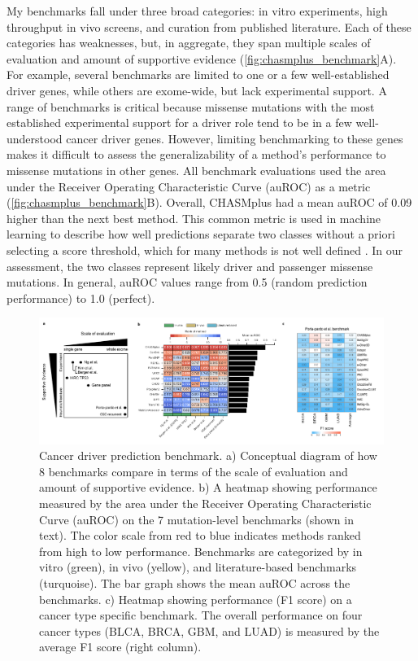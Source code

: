 My benchmarks fall under three broad categories: in vitro experiments, high throughput in vivo screens, and curation from published literature.  Each of these categories has weaknesses, but, in aggregate, they span multiple scales of evaluation and amount of supportive evidence (\autoref{fig:chasmplus_benchmark}A). For example, several benchmarks are limited to one or a few well-established driver genes, while others are exome-wide, but lack experimental support. A range of benchmarks is critical because missense mutations with the most established experimental support for a driver role tend to be in a few well-understood cancer driver genes.  However, limiting benchmarking to these genes makes it difficult to assess the generalizability of a method's performance to missense mutations in other genes. All benchmark evaluations used the area under the Receiver Operating Characteristic Curve (auROC) as a metric (\autoref{fig:chasmplus_benchmark}B).  Overall, CHASMplus had a mean auROC of 0.09 higher than the next best method. This common metric is used in machine learning to describe how well predictions separate two classes without a priori selecting a score threshold, which for many methods is not well defined \cite{RN140}. In our assessment, the two classes represent likely driver and passenger missense mutations. In general, auROC values range from 0.5 (random prediction performance) to 1.0 (perfect).

\begin{figure}
  \centering
  \makeatletter
  \let\@currsize\normalsize
  \includegraphics[width=0.9\linewidth]{figures/chapter6/chasmplus_benchmark.pdf}
  \caption[Cancer driver prediction benchmark.]{Cancer driver prediction benchmark. a) Conceptual diagram of how 8 benchmarks compare in terms of the scale of evaluation and amount of supportive evidence. b) A heatmap showing performance measured by the area under the Receiver Operating Characteristic Curve (auROC) on the 7 mutation-level benchmarks (shown in text). The color scale from red to blue indicates methods ranked from high to low performance.  Benchmarks are categorized by in vitro (green), in vivo (yellow), and literature-based benchmarks (turquoise). The bar graph shows the mean auROC across the benchmarks. c) Heatmap showing performance (F1 score) on a cancer type specific benchmark. The overall performance on four cancer types (BLCA, BRCA, GBM, and LUAD) is measured by the average F1 score (right column).}
  \label{fig:chasmplus_benchmark}
\end{figure}


